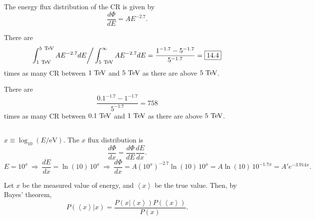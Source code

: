 \subsection{}
The energy flux distribution of the CR is given by
\begin{equation}
  \frac{d\Phi}{dE} = A E^{-2.7}.
\end{equation}

There are
\begin{equation}
  \int_{1~\text{TeV}}^{5~\text{TeV}} A E^{-2.7} dE \bigg/ \int_{5~\text{TeV}}^{\infty} A E^{-2.7} dE
  = \frac{1^{-1.7}-5^{-1.7}}{5^{-1.7}}
  = \boxed{ 14.4 }
\end{equation}
times as many CR between $1~\text{TeV}$ and $5~\text{TeV}$ as there are above $5~\text{TeV}$.

There are
\begin{equation}
  \frac{0.1^{-1.7}-1^{-1.7}}{5^{-1.7}}
  = \boxed{ 758 }
\end{equation}
times as many CR between $0.1~\text{TeV}$ and $1~\text{TeV}$ as there are above $5~\text{TeV}$.

\subsection{}
\renewcommand{\x}{\left<x\right>}
\renewcommand{\P}[1]{P\left(#1\right)}

$x \equiv \log_{10}(E/\mathrm{eV})$.
The $x$ flux distribution is
\begin{equation}
  \frac{d\Phi}{dx} = \frac{d\Phi}{dE} \frac{dE}{dx}.
\end{equation}
\begin{equation}
  E = 10^x
  \ \Rightarrow \
  \frac{dE}{dx} = \ln(10)\, 10^x
  \ \Rightarrow \
  \frac{d\Phi}{dx} = A \left(10^x\right)^{-2.7} \ln(10)\, 10^x
  = A \ln(10)\, 10^{-1.7x} = A' e^{-3.914 x}.
\end{equation}



Let $x$ be the measured value of energy, and $\x$ be the true value.
Then, by Bayes' theorem,
\begin{equation}
  \P{\x|x} = \frac{\P{x|\x} \P{\x}}{\P{x}}.
\end{equation}

